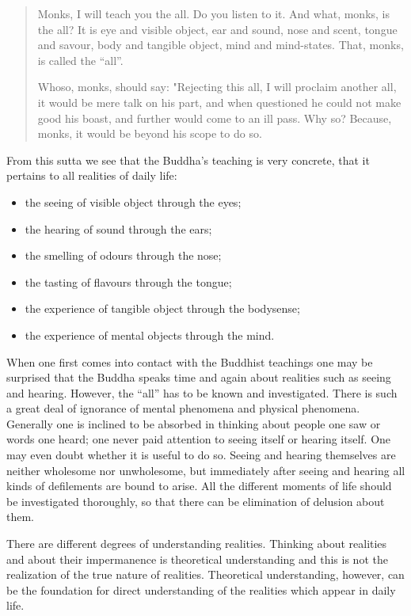 \documentclass{book}
\begin{document}
\begin{quote}
Monks, I will teach you the all. Do you listen to it. And what, monks,
is the all? It is eye and visible object, ear and sound, nose and scent,
tongue and savour, body and tangible object, mind and mind-states. That,
monks, is called the ``all''.

Whoso, monks, should say: "Rejecting this all, I will proclaim another
all, it would be mere talk on his part, and when questioned he could not
make good his boast, and further would come to an ill pass. Why so?
Because, monks, it would be beyond his scope to do so.
\end{quote}

From this sutta we see that the Buddha's teaching is very concrete, that
it pertains to all realities of daily life:

\begin{itemize}
\item
  the seeing of visible object through the eyes;
\item
  the hearing of sound through the ears;
\item
  the smelling of odours through the nose;
\item
  the tasting of flavours through the tongue;
\item
  the experience of tangible object through the bodysense;
\item
  the experience of mental objects through the mind.
\end{itemize}

When one first comes into contact with the Buddhist teachings one may be
surprised that the Buddha speaks time and again about realities such as
seeing and hearing. However, the ``all'' has to be known and
investigated. There is such a great deal of ignorance of mental
phenomena and physical phenomena. Generally one is inclined to be
absorbed in thinking about people one saw or words one heard; one never
paid attention to seeing itself or hearing itself. One may even doubt
whether it is useful to do so. Seeing and hearing themselves are neither
wholesome nor unwholesome, but immediately after seeing and hearing all
kinds of defilements are bound to arise. All the different moments of
life should be investigated thoroughly, so that there can be elimination
of delusion about them.

There are different degrees of understanding realities. Thinking about
realities and about their imper­manence is theor­etical understanding
and this is not the realization of the true nature of realities.
Theoretical understanding, however, can be the foundation for direct
understanding of the realities which appear in daily life.
\end{document}
